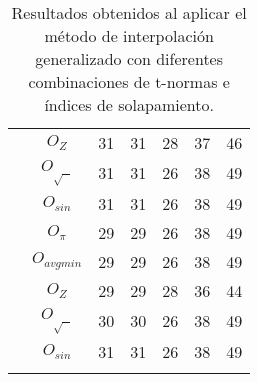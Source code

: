 \begin{longtable}{| c | c | c | c | c | c | c |}
&$O_{Z}$ &31 &31 &28 &37 &46 \\ \cline{2-7}
&$O_{\sqrt{\text{ }}}$ &31 &31 &26 &38 &49 \\ \cline{2-7}
&$O_{sin}$ &31 &31 &26 &38 &49 \\ \hhline{|=|=|=|=|=|=|=|}
\multirow{5}{*}{$T_{einstein}$}&$O_{\pi}$ &29 &29 &26 &38 &49 \\ \cline{2-7}
&$O_{avgmin}$ &29 &29 &26 &38 &49 \\ \cline{2-7}
&$O_{Z}$ &29 &29 &28 &36 &44 \\ \cline{2-7}
&$O_{\sqrt{\text{ }}}$ &30 &30 &26 &38 &49 \\ \cline{2-7}
&$O_{sin}$ &31 &31 &26 &38 &49 \\ \hline
\caption{Resultados obtenidos al aplicar el método de interpolación generalizado con diferentes combinaciones de t-normas e índices de solapamiento.}
\end{longtable}
